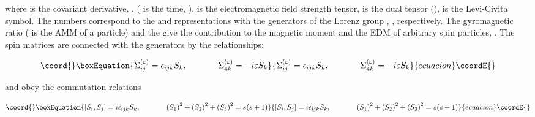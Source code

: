 \documentclass[a4paper,12pt]{article}
\begin{document}
where \coordHE{} is the covariant
derivative, \coordHE{}, \coordHE{} (\coordHE{} is the time, \coordHE{}), \coordHE{} is the electromagnetic field strength
tensor, \coordHE{} is the dual tensor (\coordHE{}), \myHighlight{$\epsilon
_{\mu \nu \alpha \beta }$}\coordHE{} is the Levi-Civita symbol. The numbers \coordHE{} correspond to the \coordHE{} and \coordHE{} representations with the generators of the Lorenz group \myHighlight{$\Sigma
_{\mu \nu }^{\left( -\right) }$}\coordHE{}, \myHighlight{$\Sigma _{\mu \nu }^{\left( +\right) }$}\coordHE{},
respectively. The gyromagnetic ratio \coordHE{} (\myHighlight{$\kappa $}\coordHE{} is the AMM
of a particle) and the \myHighlight{$\sigma $}\coordHE{} give the contribution to the magnetic
moment \coordHE{} and the EDM of arbitrary spin particles, \coordHE{}. The spin matrices \coordHE{} are connected with the generators \myHighlight{$%
\Sigma_{\mu \nu }^{(\varepsilon )}$}\coordHE{} by the relationships:

\begin{equation}\coord{}\boxEquation{
\Sigma _{ij}^{(\varepsilon )}=\epsilon _{ijk}S_k,\hspace{0.5in}\Sigma
_{4k}^{(\varepsilon )}=-i\varepsilon S_k  \label{2}
}{
\Sigma _{ij}^{(\varepsilon )}=\epsilon _{ijk}S_k,\hspace{0.5in}\Sigma
_{4k}^{(\varepsilon )}=-i\varepsilon S_k  }{ecuacion}\coordE{}\end{equation}

and obey the commutation relations

\begin{equation}\coord{}\boxEquation{
\left[ S_i,S_j\right] =i\epsilon _{ijk}S_k,\hspace{0.5in}\left( S_1\right)
^2+\left( S_2\right) ^2+\left( S_3\right) ^2=s(s+1)  \label{3}
}{
\left[ S_i,S_j\right] =i\epsilon _{ijk}S_k,\hspace{0.5in}\left( S_1\right)
^2+\left( S_2\right) ^2+\left( S_3\right) ^2=s(s+1)  }{ecuacion}\coordE{}\end{equation}
\end{document}

